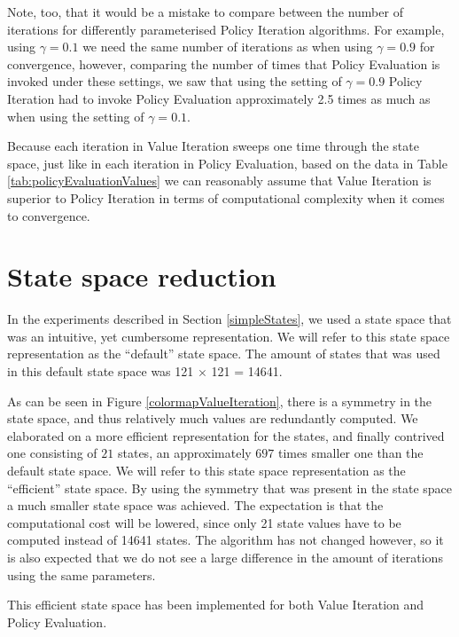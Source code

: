 \documentclass{article}
\begin{document}
Note, too, that it would be a mistake to compare between the number of iterations for differently parameterised Policy Iteration algorithms. For example, using  $\gamma = 0.1 $ we need the same number of iterations as when using $\gamma = 0.9 $  for convergence, however, comparing the number of times that Policy Evaluation is invoked under these settings, we saw that using the setting of $\gamma = 0.9 $ Policy Iteration had to invoke Policy Evaluation approximately 2.5 times as much as when using the setting of $\gamma = 0.1 $. 

Because each iteration in  Value Iteration sweeps one time through the state space, just like in each iteration in Policy Evaluation, based on the data in Table \ref{tab:policyEvaluationValues} we can reasonably assume that Value Iteration is superior to Policy Iteration in terms of computational complexity when it comes to convergence.




\section{State space reduction}\label{stateSpace}
In the experiments described in Section \ref{simpleStates}, we used a state space that was an intuitive, yet cumbersome representation. We will refer to this state space representation as the ``default'' state space. The amount of states that was used in this default state space was 121 $\times$ 121 = 14641. 

As can be seen in Figure \ref{colormapValueIteration}, there is a symmetry in the state space, and thus relatively much values are redundantly computed.
We elaborated on a more efficient representation for the states, and finally contrived one consisting of $21$ states, an approximately $697$ times smaller one than the default state space. We will refer to this state space representation as the ``efficient'' state space.  By using the symmetry that was present in the state space a much smaller state space was achieved. The expectation is that the computational cost will be lowered, since only 21 state values have to be computed instead of 14641 states. The algorithm has not changed however, so it is also expected that we do not see a large difference in the amount of iterations using the same parameters. 

This efficient state space has been implemented for both Value Iteration and Policy Evaluation. 
\end{document}
